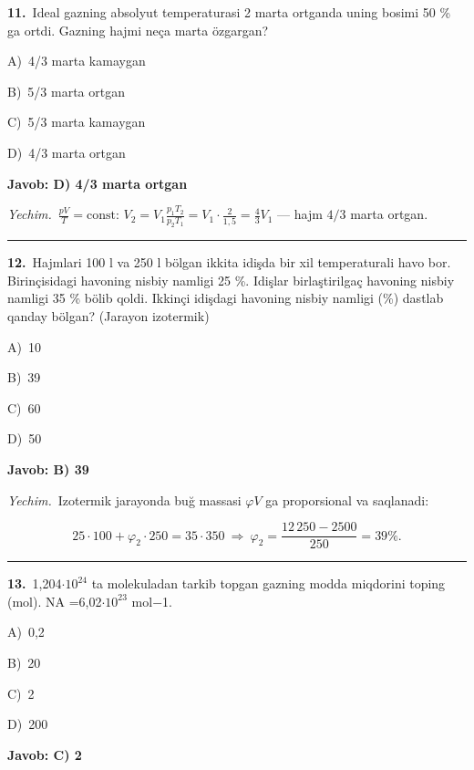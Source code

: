 \documentclass[11pt,a4paper]{article}
\newcommand{\opt}[2]{\hspace*{4mm}#1)\ #2\par}
\begin{document}
\noindent\begin{minipage}{\linewidth}
\textbf{11.}\ Ideal gazning absolyut temperaturasi 2 marta ortganda uning bosimi 50 \% ga ortdi. Gazning hajmi neça marta özgargan?\par\smallskip
\opt{A}{4/3 marta kamaygan}
\opt{B}{5/3 marta ortgan}
\opt{C}{5/3 marta kamaygan}
\opt{D}{4/3 marta ortgan}
\end{minipage}\vspace{2pt}\par
\noindent\colorbox{gray!12}{\parbox{\dimexpr\linewidth-2\fboxsep}{\textbf{Javob: D) 4/3 marta ortgan}}}\par\smallskip
\noindent\textit{Yechim.}\ $\frac{pV}{T}=\text{const}$: $V_2=V_1\frac{p_1T_2}{p_2T_1}=V_1\cdot\frac{2}{1{,}5}=\frac43V_1$ — hajm $4/3$ marta ortgan.\par\par\medskip\hrule\medskip
{}\noindent\begin{minipage}{\linewidth}
\textbf{12.}\ Hajmlari 100 l va 250 l bölgan ikkita idişda bir xil temperaturali havo bor. Birinçisidagi havoning nisbiy namligi 25 \%. Idişlar birlaştirilgaç havoning nisbiy namligi 35 \% bölib qoldi. Ikkinçi idişdagi havoning nisbiy namligi (\%) dastlab qanday bölgan? (Jarayon izotermik)\par\smallskip
\opt{A}{10}
\opt{B}{39}
\opt{C}{60}
\opt{D}{50}
\end{minipage}\vspace{2pt}\par
\noindent\colorbox{gray!12}{\parbox{\dimexpr\linewidth-2\fboxsep}{\textbf{Javob: B) 39}}}\par\smallskip
\noindent\textit{Yechim.}\ Izotermik jarayonda buğ massasi $\varphi V$ ga proporsional va saqlanadi:\par
\[25\cdot100+\varphi_2\cdot250=35\cdot350\ \Rightarrow\ \varphi_2=\frac{12\,250-2500}{250}=39\%.\]\par\medskip\hrule\medskip
{}\noindent\begin{minipage}{\linewidth}
\textbf{13.}\ 1,204$\cdot10^{24}$ ta molekuladan tarkib topgan gazning modda miqdorini toping (mol). NA =6,02$\cdot10^{23}$ mol$-$1.\par\smallskip
\opt{A}{0,2}
\opt{B}{20}
\opt{C}{2}
\opt{D}{200}
\end{minipage}\vspace{2pt}\par
\noindent\colorbox{gray!12}{\parbox{\dimexpr\linewidth-2\fboxsep}{\textbf{Javob: C) 2}}}\par\smallskip
\end{document}
